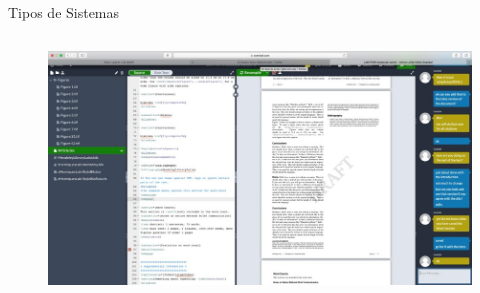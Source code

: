 \documentclass{beamer}
\begin{document}
\begin{frame}[shrink=10]{Tipos de Sistemas}
\begin{columns}
\begin{column}{0.5\textwidth}
\begin{figure}
\begin{overprint}
                        \includegraphics[width=0.8\linewidth]{Images/overleaf.jpg}                                                         
                \end{overprint}
            \end{figure}
        \end{column}
    \end{columns}
\end{frame}
\end{document}
